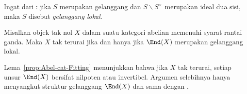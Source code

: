 Ingat dari \cite[Definisi 6.12.3]{Li1}: jika $S$ merupakan gelanggang dan
$S\smallsetminus S^\times$ merupakan ideal dua sisi, maka $S$ disebut
\emph{gelanggang lokal}.

\begin{korolari}\label{prop:indecomposable-local-ring}
	Misalkan objek tak nol $X$ dalam suatu kategori abelian memenuhi syarat
	rantai ganda. Maka $X$ tak terurai jika dan hanya jika $\End(X)$ merupakan
	gelanggang lokal.
\end{korolari}
\begin{bukti}
	Lema~\ref{prop:Abel-cat-Fitting} menunjukkan bahwa jika $X$ tak terurai,
	setiap unsur $\End(X)$ bersifat nilpoten atau invertibel. Argumen selebihnya
	hanya menyangkut struktur gelanggang $\End(X)$ dan sama dengan
	\cite[Lema 6.12.6]{Li1}.
\end{bukti}

